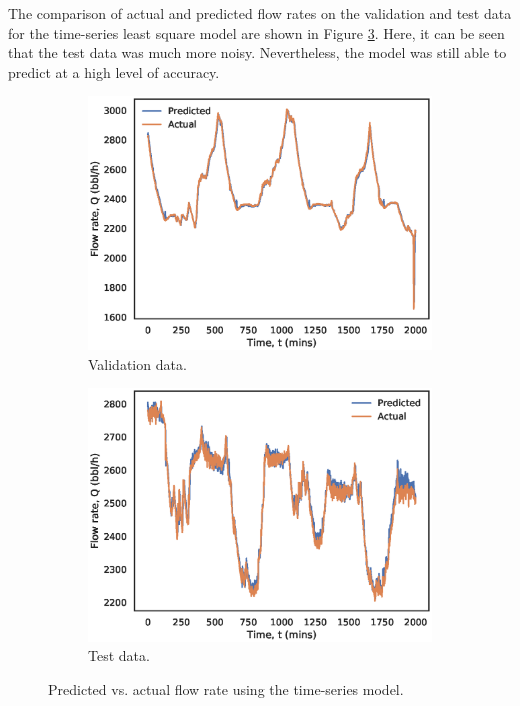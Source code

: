 The comparison of actual and predicted flow rates on the validation and test data for the time-series least square model are shown in Figure \ref{fig:08ts_ls}.   Here, it can be seen that the test data was much more noisy.  Nevertheless, the model was still able to predict at a high level of accuracy.
\begin{figure}[h]
    \centering
     \begin{subfigure}[b]{0.48\textwidth}
         \includegraphics[width=\textwidth]{images/08ts_validation.eps}
         \caption{Validation data.}
         \label{fig:08ts_valid}
     \end{subfigure}
     \begin{subfigure}[b]{0.48\textwidth}
         \includegraphics[width=\textwidth]{images/08ts_test.eps}
         \caption{Test data.}
         \label{fig:08ts_test}
     \end{subfigure}
        \caption{Predicted vs. actual flow rate using the time-series model.}
        \label{fig:08ts_ls}
\end{figure}



